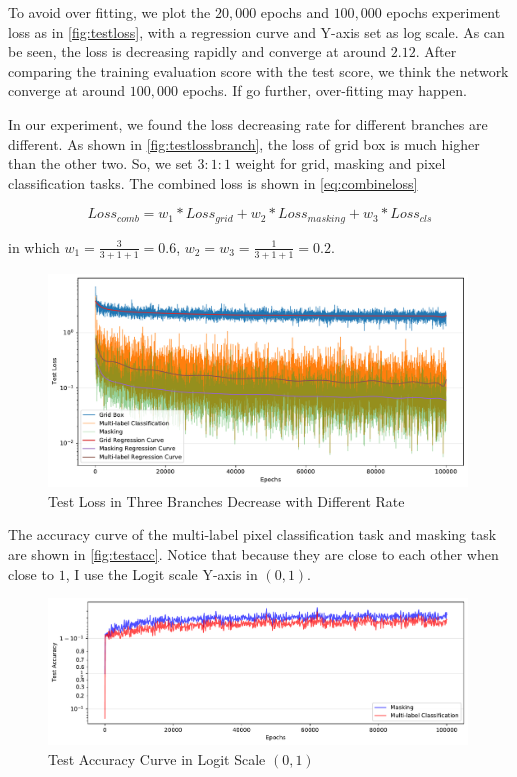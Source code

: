 \begin{spacing}{1.5}
To avoid over fitting, we plot the $20,000$ epochs and $100,000$ epochs experiment loss as in \autoref{fig:testloss}, with a regression curve and Y-axis set as log scale. As can be seen, the loss is decreasing rapidly and converge at around $2.12$. After comparing the training evaluation score with the test score, we think the network converge at around $100,000$ epochs. If go further, over-fitting may happen.

In our experiment, we found the loss decreasing rate for different branches are different. As shown in \autoref{fig:testlossbranch}, the loss of grid box is much higher than the other two. So, we set $3:1:1$ weight for grid, masking and pixel classification tasks. The combined loss is shown in \autoref{eq:combineloss}

\begin{equation}
\label{eq:combineloss}
    Loss_{comb}=w_1*{Loss_{grid}}+w_2*{Loss_{masking}}+w_3*{Loss_{cls}}
\end{equation}

in which $w_1=\frac{3}{3+1+1}=0.6$, $w_2=w_3=\frac{1}{3+1+1}=0.2$.

\begin{figure}[ht]
\centering
\includegraphics[width=0.99\textwidth, fbox]{Chapter5/testlossbranch.pdf}
\caption{Test Loss in Three Branches Decrease with Different Rate}
\label{fig:testlossbranch} 
\end{figure}

The accuracy curve of the multi-label pixel classification task and masking task are shown in \autoref{fig:testacc}. Notice that because they are close to each other when close to $1$, I use the Logit scale Y-axis in $(0,1)$.

\begin{figure}[ht]
\centering
\includegraphics[width=0.99\textwidth, fbox]{Chapter5/testacc.pdf}
\caption{Test Accuracy Curve in Logit Scale $(0,1)$}
\label{fig:testacc} 
\end{figure}


\end{spacing}

